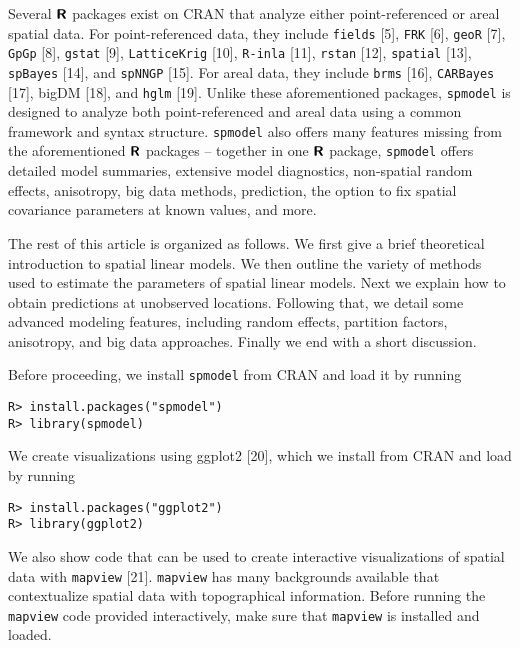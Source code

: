 \documentclass[10pt,letterpaper]{article}
\begin{document}
Several \(\textbf{\textsf{R}}\) packages exist on CRAN that analyze
either point-referenced or areal spatial data. For point-referenced
data, they include \texttt{fields} {[}5{]}, \texttt{FRK} {[}6{]},
\texttt{geoR} {[}7{]}, \texttt{GpGp} {[}8{]}, \texttt{gstat} {[}9{]},
\texttt{LatticeKrig} {[}10{]}, \texttt{R-inla} {[}11{]}, \texttt{rstan}
{[}12{]}, \texttt{spatial} {[}13{]}, \texttt{spBayes} {[}14{]}, and
\texttt{spNNGP} {[}15{]}. For areal data, they include \texttt{brms}
{[}16{]}, \texttt{CARBayes} {[}17{]}, bigDM {[}18{]}, and \texttt{hglm}
{[}19{]}. Unlike these aforementioned packages, \texttt{spmodel} is
designed to analyze both point-referenced and areal data using a common
framework and syntax structure. \texttt{spmodel} also offers many
features missing from the aforementioned \(\textbf{\textsf{R}}\)
packages -- together in one \(\textbf{\textsf{R}}\) package,
\texttt{spmodel} offers detailed model summaries, extensive model
diagnostics, non-spatial random effects, anisotropy, big data methods,
prediction, the option to fix spatial covariance parameters at known
values, and more.

The rest of this article is organized as follows. We first give a brief
theoretical introduction to spatial linear models. We then outline the
variety of methods used to estimate the parameters of spatial linear
models. Next we explain how to obtain predictions at unobserved
locations. Following that, we detail some advanced modeling features,
including random effects, partition factors, anisotropy, and big data
approaches. Finally we end with a short discussion.

Before proceeding, we install \texttt{spmodel} from CRAN and load it by
running

\begin{verbatim}
R> install.packages("spmodel")
R> library(spmodel)
\end{verbatim}

We create visualizations using ggplot2 {[}20{]}, which we install from
CRAN and load by running

\begin{verbatim}
R> install.packages("ggplot2")
R> library(ggplot2)
\end{verbatim}

We also show code that can be used to create interactive visualizations
of spatial data with \texttt{mapview} {[}21{]}. \texttt{mapview} has
many backgrounds available that contextualize spatial data with
topographical information. Before running the \texttt{mapview} code
provided interactively, make sure that \texttt{mapview} is installed and
loaded.
\end{document}
